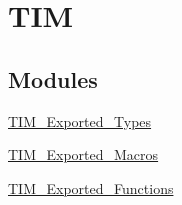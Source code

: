 \hypertarget{group__TIM}{
\section{TIM}
\label{group__TIM}
}
\subsection*{Modules}
\begin{DoxyCompactItemize}
\item 
\hyperlink{group__TIM__Exported__Types}{TIM\_\-Exported\_\-Types}
\item 
\hyperlink{group__TIM__Exported__Macros}{TIM\_\-Exported\_\-Macros}
\item 
\hyperlink{group__TIM__Exported__Functions}{TIM\_\-Exported\_\-Functions}
\end{DoxyCompactItemize}
